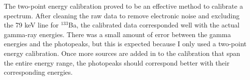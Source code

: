 The two-point energy calibration proved to be an effective method to calibrate a
spectrum. After cleaning the raw data to remove electronic noise and excluding
the 79 keV line for $^{133}$Ba, the calibrated data corresponded well with the actual
gamma-ray energies. There was a small amount of error between the gamma energies
and the photopeaks, but this is expected because I only used a two-point
energy calibration. Once more sources are added in to the calibration that span the
entire energy range, the photopeaks
should correspond better with their corresponding energies.
